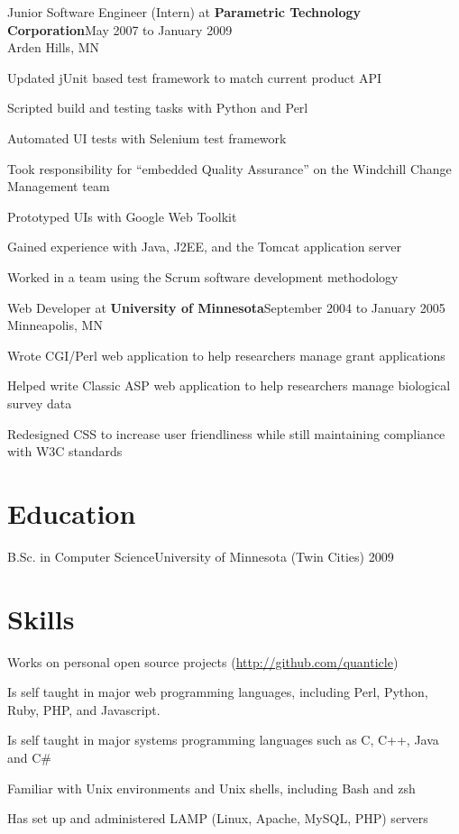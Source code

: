\documentclass[letterpaper]{article}
\newenvironment{resume-list}
{\begin{itemize}
 \setlength{\itemsep}{0pt}
 \setlength{\parskip}{0pt}}
{\end{itemize}}
\begin{document}
\noindent Junior Software Engineer (Intern) at {\bfseries Parametric Technology Corporation}\dotfill May 2007 to January 2009\\
Arden Hills, MN
\begin{resume-list}
\item Updated jUnit based test framework to match current product API
\item Scripted build and testing tasks with Python and Perl
\item Automated UI tests with Selenium test framework
\item Took responsibility for ``embedded Quality Assurance'' on the Windchill Change Management team
\item Prototyped UIs with Google Web Toolkit
\item Gained experience with Java, J2EE, and the Tomcat application server
\item Worked in a team using the Scrum software development methodology
\end{resume-list}
\noindent Web Developer at {\bfseries University of Minnesota}\dotfill September 2004 to January 2005\\
Minneapolis, MN
\begin{resume-list}
\item Wrote CGI/Perl web application to help researchers manage grant applications
\item Helped write Classic ASP web application to help researchers manage biological survey data
\item Redesigned CSS to increase user friendliness while still maintaining compliance with W3C standards
\end{resume-list}
\section*{Education}
\noindent B.Sc. in Computer Science\dotfill University of Minnesota (Twin Cities) 2009\\
\section*{Skills}
\begin{resume-list}
\item Works on personal open source projects (\url{http://github.com/quanticle})
\item Is self taught in major web programming languages, including Perl, Python, Ruby, PHP, and Javascript.
\item Is self taught in major systems programming languages such as C, C++, Java and C\#
\item Familiar with Unix environments and Unix shells, including Bash and zsh
\item Has set up and administered LAMP (Linux, Apache, MySQL, PHP) servers
\end{resume-list}
\end{document}
